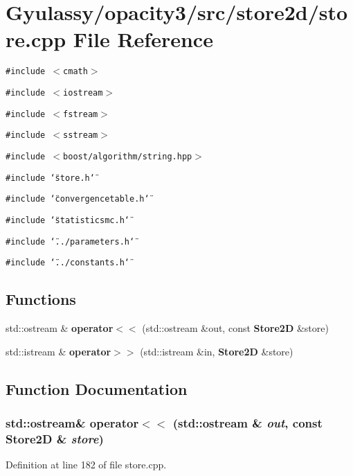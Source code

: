 \section{Gyulassy/opacity3/src/store2d/store.cpp File Reference}
\label{store_8cpp}
{\tt \#include $<$cmath$>$}\par
{\tt \#include $<$iostream$>$}\par
{\tt \#include $<$fstream$>$}\par
{\tt \#include $<$sstream$>$}\par
{\tt \#include $<$boost/algorithm/string.hpp$>$}\par
{\tt \#include \char`\"{}store.h\char`\"{}}\par
{\tt \#include \char`\"{}convergencetable.h\char`\"{}}\par
{\tt \#include \char`\"{}statisticsmc.h\char`\"{}}\par
{\tt \#include \char`\"{}../parameters.h\char`\"{}}\par
{\tt \#include \char`\"{}../constants.h\char`\"{}}\par
\subsection*{Functions}
\begin{CompactItemize}
\item 
std::ostream \& {\bf operator$<$$<$} (std::ostream \&out, const {\bf Store2D} \&store)
\item 
std::istream \& {\bf operator$>$$>$} (std::istream \&in, {\bf Store2D} \&store)
\end{CompactItemize}


\subsection{Function Documentation}
\subsubsection{\setlength{\rightskip}{0pt plus 5cm}std::ostream\& operator$<$$<$ (std::ostream \& {\em out}, const {\bf Store2D} \& {\em store})}\label{store_8cpp_9e796d51abbd87d71beadcf2eb5ec49c}




Definition at line 182 of file store.cpp.

